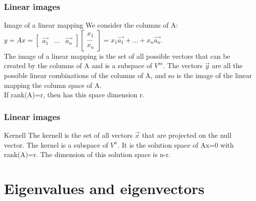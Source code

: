 \begin{frame}
	\frametitle{Linear images}
	\begin{block}{Image of a linear mapping}
		We consider the columns of A: $y=Ax=\begin{bmatrix}
		\overrightarrow{a_1} & ... & \overrightarrow{a_n}
		\end{bmatrix}\begin{bmatrix}
		x_1\\...\\x_n
		\end{bmatrix}=x_1\overrightarrow{a_1}+...+x_n\overrightarrow{a_n}$.\\
		The image of a linear mapping is the set of all possible vectors that can be created by the columns of A and is a subspace of $V^m$. The vectors $\overrightarrow{y}$ are all the possible linear combinations of the columns of A, and so is the image of the linear mapping the column space of A. \\
		If rank(A)=r, then has this space dimension r.
	\end{block}
\end{frame}

\begin{frame}
	\frametitle{Linear images}
	\begin{block}{Kernell}
		The kernell is the set of all vectors $\overrightarrow{x}$ that are projected on the null vector. The kernel is a subspace of $V^n$. It is the solution space of Ax=0 with rank(A)=r. The dimension of this solution space is n-r.\vspace{4mm}
	\end{block}
\end{frame}

\section{Eigenvalues and eigenvectors}

